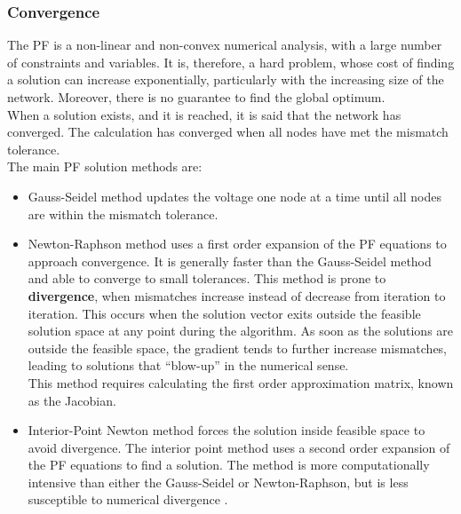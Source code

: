 \subsubsection{Convergence}
The \gls{PF} is a non-linear and non-convex numerical analysis, with a large number of constraints and variables. It is, therefore, a hard problem, whose cost of finding a solution can increase exponentially, particularly with the increasing size of the network. Moreover, there is no guarantee to find the global optimum. \\
When a solution exists, and it is reached, it is said that the network has converged. The calculation has converged when all nodes have met the mismatch tolerance. \\
The main \gls{PF} solution methods are:
\begin{itemize}
    \item Gauss-Seidel method updates the voltage one node at a time until all nodes are within the mismatch tolerance.
    
    \item Newton-Raphson method uses a first order expansion of the \gls{PF} equations to approach convergence. It is generally faster than the Gauss-Seidel method and able to converge to small tolerances. This method is prone to \textbf{divergence}, when mismatches increase instead of decrease from iteration to iteration. This occurs when the solution vector exits outside the feasible solution space at any point during the algorithm. As soon as the solutions are outside the feasible space, the gradient tends to further increase mismatches, leading to solutions that “blow-up” in the numerical sense.\\
    This method requires calculating the first order approximation matrix, known as the Jacobian.
    \item Interior-Point Newton method forces the solution inside feasible space to avoid divergence. The interior point method uses a second order expansion of the \gls{PF} equations to find a solution. The method is more computationally intensive than either the Gauss-Seidel or Newton-Raphson, but is less susceptible to numerical divergence \cite{pfmethods}.
\end{itemize}

